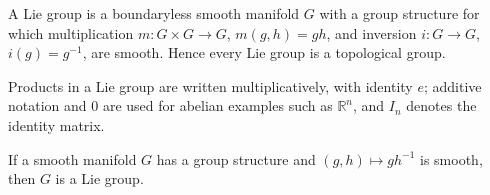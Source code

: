 
\begin{definition}
\label{def:7-46-extra-1}



A Lie group is a boundaryless smooth manifold $G$ with a group structure for which multiplication $m:G\times G\to G$, $m(g,h)=gh$, and inversion $i:G\to G$, $i(g)=g^{-1}$, are smooth. Hence every Lie group is a topological group.
\end{definition}

\begin{notation}
\label{not:7-46-extra-2}



Products in a Lie group are written multiplicatively, with identity $e$;
additive notation and $0$ are used for abelian examples such as $\mathbb R^n$,
and $I_n$ denotes the identity matrix.
\end{notation}

\begin{proposition}
\label{prop:7-1}




If a smooth manifold $G$ has a group structure and $(g,h)\mapsto gh^{-1}$ is smooth, then $G$ is a Lie group.
\end{proposition}


